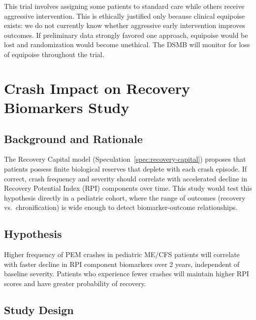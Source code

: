 \begin{warning}
This trial involves assigning some patients to standard care while others receive aggressive intervention. This is ethically justified only because clinical equipoise exists: we do not currently know whether aggressive early intervention improves outcomes. If preliminary data strongly favored one approach, equipoise would be lost and randomization would become unethical. The DSMB will monitor for loss of equipoise throughout the trial.
\end{warning}

\section{Crash Impact on Recovery Biomarkers Study}
\label{sec:crash-impact-study}

\subsection{Background and Rationale}

The Recovery Capital model (Speculation~\ref{spec:recovery-capital}) proposes that patients possess finite biological reserves that deplete with each crash episode. If correct, crash frequency and severity should correlate with accelerated decline in Recovery Potential Index (RPI) components over time. This study would test this hypothesis directly in a pediatric cohort, where the range of outcomes (recovery vs.\ chronification) is wide enough to detect biomarker-outcome relationships.

\subsection{Hypothesis}

\begin{hypothesis}
Higher frequency of PEM crashes in pediatric ME/CFS patients will correlate with faster decline in RPI component biomarkers over 2 years, independent of baseline severity. Patients who experience fewer crashes will maintain higher RPI scores and have greater probability of recovery.
\end{hypothesis}

\subsection{Study Design}

